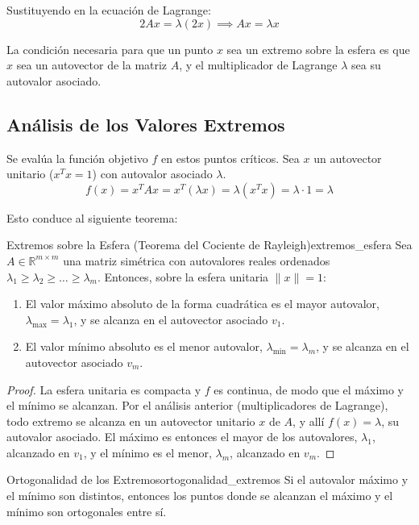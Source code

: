 \documentclass[11pt, a4paper]{article}
\begin{document}
Sustituyendo en la ecuación de Lagrange:
\[ 2Ax = \lambda (2x) \implies Ax = \lambda x \]

\obs La condición necesaria para que un punto $x$ sea un extremo sobre la esfera es que $x$ sea un autovector de la matriz $A$, y el multiplicador de Lagrange $\lambda$ sea su autovalor asociado.

\subsection{Análisis de los Valores Extremos}

Se evalúa la función objetivo $f$ en estos puntos críticos. Sea $x$ un autovector unitario ($x^T x = 1$) con autovalor asociado $\lambda$.
\[ f(x) = x^T A x = x^T (\lambda x) = \lambda (x^T x) = \lambda \cdot 1 = \lambda \]

Esto conduce al siguiente teorema:

\begin{teorema}{Extremos sobre la Esfera (Teorema del Cociente de Rayleigh)}{extremos_esfera}
Sea $A \in \mathbb{R}^{m \times m}$ una matriz simétrica con autovalores reales ordenados $\lambda_1 \geq \lambda_2 \geq \dots \geq \lambda_m$.
Entonces, sobre la esfera unitaria $\|x\|=1$:
\begin{enumerate}
    \item El valor máximo absoluto de la forma cuadrática es el mayor autovalor, $\lambda_{\max} = \lambda_1$, y se alcanza en el autovector asociado $v_1$.
    \item El valor mínimo absoluto es el menor autovalor, $\lambda_{\min} = \lambda_m$, y se alcanza en el autovector asociado $v_m$.
\end{enumerate}
\end{teorema}

\begin{proof}
La esfera unitaria es compacta y $f$ es continua, de modo que el máximo y el mínimo se alcanzan. Por el análisis anterior (multiplicadores de Lagrange), todo extremo se alcanza en un autovector unitario $x$ de $A$, y allí $f(x) = \lambda$, su autovalor asociado. El máximo es entonces el mayor de los autovalores, $\lambda_1$, alcanzado en $v_1$, y el mínimo es el menor, $\lambda_m$, alcanzado en $v_m$.
\end{proof}

\begin{corolario}{Ortogonalidad de los Extremos}{ortogonalidad_extremos}
Si el autovalor máximo y el mínimo son distintos, entonces los puntos donde se alcanzan el máximo y el mínimo son ortogonales entre sí.
\end{corolario}
\end{document}

